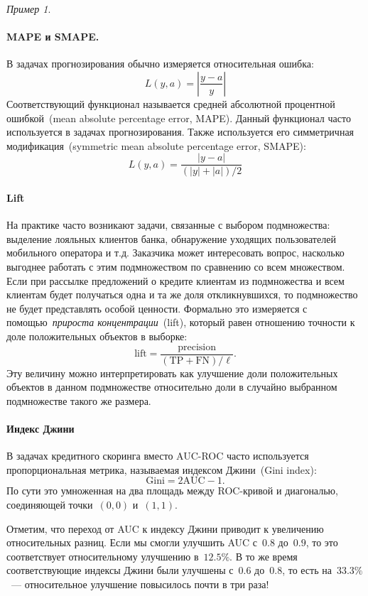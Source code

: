 \documentclass[a4paper, 12pt]{article}
\theoremstyle{plain} %
\theoremstyle{definition} %
\theoremstyle{remark} %
\newtheorem{example}{Пример}
\begin{document}
\begin{example}
\paragraph{MAPE и SMAPE.}

В задачах прогнозирования обычно измеряется относительная ошибка:
\[
    L(y, a) = \left| \frac{y - a}{y} \right|
\]
Соответствующий функционал называется средней абсолютной процентной ошибкой~(mean
absolute percentage error, MAPE).
Данный функционал часто используется в задачах прогнозирования.
Также используется его симметричная модификация~(symmetric mean absolute percentage error, SMAPE):
\[
    L(y, a) = \frac{|y - a|}{(|y| + |a|) / 2}
\]

\paragraph{Lift}
На практике часто возникают задачи, связанные с выбором подмножества: выделение лояльных клиентов банка,
обнаружение уходящих пользователей мобильного оператора и т.д.
Заказчика может интересовать вопрос, насколько выгоднее работать с этим подмножеством
по сравнению со всем множеством.
Если при рассылке предложений о кредите клиентам из подмножества и всем клиентам
будет получаться одна и та же доля откликнувшихся, то подмножество не будет
представлять особой ценности.
Формально это измеряется с помощью~\emph{прироста концентрации}~(lift),
который равен отношению точности к доле положительных объектов в выборке:
\[
    \text{lift}
    =
    \frac{
        \text{precision}
    }{
        (\text{TP} + \text{FN}) / \ell
    }.
\]
Эту величину можно интерпретировать как улучшение доли положительных объектов
в данном подмножестве относительно доли в случайно выбранном подмножестве такого же размера.

\paragraph{Индекс Джини}
В задачах кредитного скоринга вместо AUC-ROC часто используется пропорциональная
метрика, называемая индексом Джини~(Gini index):
\[
    \text{Gini}
    =
    2 \text{AUC} - 1.
\]
По сути это умноженная на два площадь между ROC-кривой и диагональю, соединяющей точки~$(0, 0)$ и~$(1, 1)$.

Отметим, что переход от AUC к индексу Джини приводит к увеличению относительных разниц.
Если мы смогли улучшить AUC с~$0.8$ до~$0.9$, то это соответствует
относительному улучшению в~$12.5\%$.
В то же время соответствующие индексы Джини были улучшены с~$0.6$ до~$0.8$,
то есть на~$33.3\%$~--- относительное улучшение повысилось почти в три раза!


\end{example}
\end{document}
